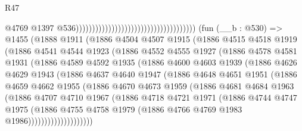\begin{lexlean}{R47}
\begin{coremodule}
                                                                              @4769
                                                                              @1397
                                                                              @536)))))))))))))))))))))))))))))))))))))
    (fun (__b : @530) =>
    @1455
      (@1888
        @1911
        (@1886
          @4504
          @4507
          @1915
          (@1886
            @4515
            @4518
            @1919
            (@1886
              @4541
              @4544
              @1923
              (@1886
                @4552
                @4555
                @1927
                (@1886
                  @4578
                  @4581
                  @1931
                  (@1886
                    @4589
                    @4592
                    @1935
                    (@1886
                      @4600
                      @4603
                      @1939
                      (@1886
                        @4626
                        @4629
                        @1943
                        (@1886
                          @4637
                          @4640
                          @1947
                          (@1886
                            @4648
                            @4651
                            @1951
                            (@1886
                              @4659
                              @4662
                              @1955
                              (@1886
                                @4670
                                @4673
                                @1959
                                (@1886
                                  @4681
                                  @4684
                                  @1963
                                  (@1886
                                    @4707
                                    @4710
                                    @1967
                                    (@1886
                                      @4718
                                      @4721
                                      @1971
                                      (@1886
                                        @4744
                                        @4747
                                        @1975
                                        (@1886
                                          @4755
                                          @4758
                                          @1979
                                          (@1886 @4766 @4769 @1983 @1986))))))))))))))))))))

\end{coremodule}
\end{lexlean}
